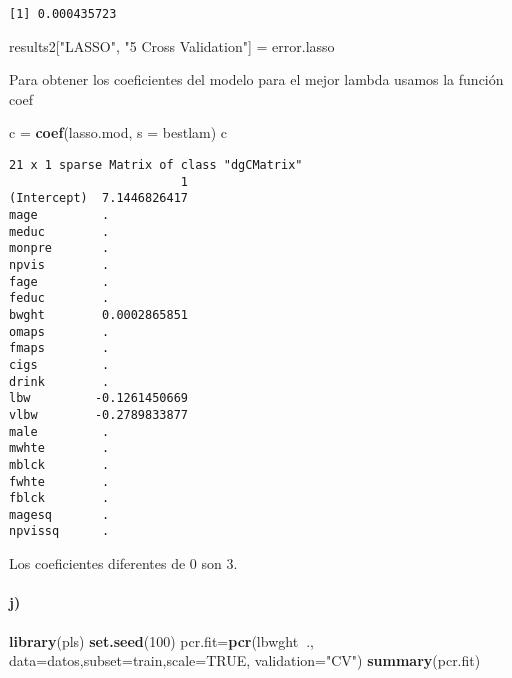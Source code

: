 \documentclass[]{article}
\newenvironment{Shaded}{\begin{snugshade}}{\end{snugshade}}
\newcommand{\KeywordTok}[1]{\textcolor[rgb]{0.13,0.29,0.53}{\textbf{#1}}}
\newcommand{\DataTypeTok}[1]{\textcolor[rgb]{0.13,0.29,0.53}{#1}}
\newcommand{\DecValTok}[1]{\textcolor[rgb]{0.00,0.00,0.81}{#1}}
\newcommand{\StringTok}[1]{\textcolor[rgb]{0.31,0.60,0.02}{#1}}
\newcommand{\OtherTok}[1]{\textcolor[rgb]{0.56,0.35,0.01}{#1}}
\newcommand{\OperatorTok}[1]{\textcolor[rgb]{0.81,0.36,0.00}{\textbf{#1}}}
\newcommand{\NormalTok}[1]{#1}
\let\oldparagraph\paragraph
\renewcommand{\paragraph}[1]{\oldparagraph{#1}\mbox{}}
\begin{document}
\begin{verbatim}
[1] 0.000435723
\end{verbatim}

\begin{Shaded}
\begin{Highlighting}[]
\NormalTok{results2[}\StringTok{"LASSO"}\NormalTok{, }\StringTok{"5 Cross Validation"}\NormalTok{] =}\StringTok{ }\NormalTok{error.lasso}
\end{Highlighting}
\end{Shaded}

Para obtener los coeficientes del modelo para el mejor lambda usamos la
función coef

\begin{Shaded}
\begin{Highlighting}[]
\NormalTok{c =}\StringTok{ }\KeywordTok{coef}\NormalTok{(lasso.mod, }\DataTypeTok{s =}\NormalTok{ bestlam)}
\NormalTok{c}
\end{Highlighting}
\end{Shaded}

\begin{verbatim}
21 x 1 sparse Matrix of class "dgCMatrix"
                        1
(Intercept)  7.1446826417
mage         .           
meduc        .           
monpre       .           
npvis        .           
fage         .           
feduc        .           
bwght        0.0002865851
omaps        .           
fmaps        .           
cigs         .           
drink        .           
lbw         -0.1261450669
vlbw        -0.2789833877
male         .           
mwhte        .           
mblck        .           
fwhte        .           
fblck        .           
magesq       .           
npvissq      .           
\end{verbatim}

Los coeficientes diferentes de 0 son 3.

\paragraph{j)}\label{j}

\begin{Shaded}
\begin{Highlighting}[]
\KeywordTok{library}\NormalTok{(pls)}
\KeywordTok{set.seed}\NormalTok{(}\DecValTok{100}\NormalTok{)}
\NormalTok{pcr.fit=}\KeywordTok{pcr}\NormalTok{(lbwght}\OperatorTok{~}\NormalTok{., }\DataTypeTok{data=}\NormalTok{datos,}\DataTypeTok{subset=}\NormalTok{train,}\DataTypeTok{scale=}\OtherTok{TRUE}\NormalTok{, }\DataTypeTok{validation=}\StringTok{"CV"}\NormalTok{)}
\KeywordTok{summary}\NormalTok{(pcr.fit)}
\end{Highlighting}
\end{Shaded}
\end{document}
